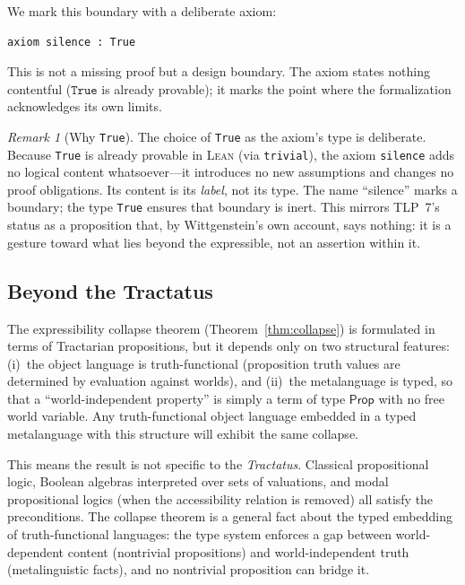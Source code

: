 \documentclass[10pt, letterpaper]{article}
\theoremstyle{definition}
\theoremstyle{remark}
\newtheorem{remark}[theorem]{Remark}
\newcommand{\Prop}{\mathsf{Prop}}
\newcommand{\Lean}{\textsc{Lean}}
\begin{document}
We mark this boundary with a deliberate axiom:

\begin{lstlisting}
axiom silence : True
\end{lstlisting}

\noindent
This is not a missing proof but a design boundary.  The axiom
states nothing contentful ($\mathtt{True}$ is already provable);
it marks the point where the formalization acknowledges its own
limits.

\begin{remark}[Why \texttt{True}]
\label{rem:why-true}
The choice of \texttt{True} as the axiom's type is deliberate.
Because \texttt{True} is already provable in \Lean{} (via
\texttt{trivial}), the axiom \texttt{silence} adds no logical
content whatsoever---it introduces no new assumptions and
changes no proof obligations.  Its content is its \emph{label},
not its type.  The name ``silence'' marks a boundary; the
type \texttt{True} ensures that boundary is inert.  This
mirrors TLP~7's status as a proposition that, by Wittgenstein's
own account, says nothing: it is a gesture toward what lies
beyond the expressible, not an assertion within it.
\end{remark}

\subsection{Beyond the Tractatus}
\label{sec:beyond}

The expressibility collapse theorem
(Theorem~\ref{thm:collapse}) is formulated in terms of
Tractarian propositions, but it depends only on two structural
features: (i)~the object language is truth-functional
(proposition truth values are determined by evaluation against
worlds), and (ii)~the metalanguage is typed, so that a
``world-independent property'' is simply a term of type
$\Prop$ with no free world variable.  Any truth-functional
object language embedded in a typed metalanguage with this
structure will exhibit the same collapse.

This means the result is not specific to the
\emph{Tractatus}.  Classical propositional logic, Boolean
algebras interpreted over sets of valuations, and modal
propositional logics (when the accessibility relation is
removed) all satisfy the preconditions.  The collapse theorem
is a general fact about the typed embedding of truth-functional
languages: the type system enforces a gap between
world-dependent content (nontrivial propositions) and
world-independent truth (metalinguistic facts), and no
nontrivial proposition can bridge it.
\end{document}
